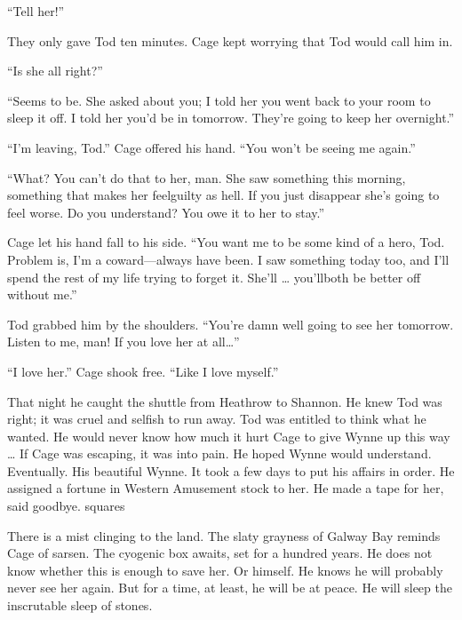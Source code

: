“Tell her!”

They only gave Tod ten minutes. Cage kept worrying that Tod would call him in.

“Is she all right?”

“Seems to be. She asked about you; I told her you went back to your room to sleep it off. I told her you’d be in tomorrow. They’re going to keep her overnight.”

“I’m leaving, Tod.” Cage offered his hand. “You won’t be seeing me again.”

“What? You can’t do that to her, man. She saw something this morning, something that makes her feelguilty as hell. If you just disappear she’s going to feel worse. Do you understand? You owe it to her to stay.”

Cage let his hand fall to his side. “You want me to be some kind of a hero, Tod. Problem is, I’m a coward—always have been. I saw something today too, and I’ll spend the rest of my life trying to forget it. She’ll … you’llboth be better off without me.”

Tod grabbed him by the shoulders. “You’re damn well going to see her tomorrow. Listen to me, man! If you love her at all…”

“I love her.” Cage shook free. “Like I love myself.”

That night he caught the shuttle from Heathrow to Shannon. He knew Tod was right; it was cruel and selfish to run away. Tod was entitled to think what he wanted. He would never know how much it hurt Cage to give Wynne up this way … If Cage was escaping, it was into pain. He hoped Wynne would understand. Eventually. His beautiful Wynne. It took a few days to put his affairs in order. He assigned a fortune in Western Amusement stock to her. He made a tape for her, said goodbye.
squares

There is a mist clinging to the land. The slaty grayness of Galway Bay reminds Cage of sarsen. The cyogenic box awaits, set for a hundred years. He does not know whether this is enough to save her. Or himself. He knows he will probably never see her again. But for a time, at least, he will be at peace. He will sleep the inscrutable sleep of stones.